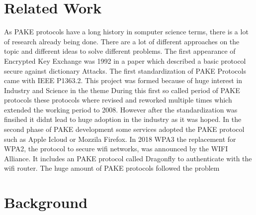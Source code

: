 \documentclass[journal]{IEEEtran}
\begin{document}
\section{Related Work}
As PAKE protocols have a long history in somputer science terms, there is a lot of research already being done.
There are a lot of different approaches on the topic and different ideas to solve different problems.
The first appearance of Encrypted Key Exchange was 1992 in a paper which described a basic protocol secure against dictionary Attacks.
The first standardization of PAKE Protocols came with IEEE P1363.2. This project was formed because of huge interest in Industry and Science in the theme
During this first so called period of PAKE protocols these protocols where revised and reworked multiple times which extended the working period to 2008.
However after the standardization was finsihed it didnt lead to huge adoption in the industry as it was hoped.
In the second phase of PAKE development some services adopted the PAKE protocol such as Apple Icloud or Mozzila Firefox.
In 2018 WPA3 the replacement for WPA2, the protocol to secure wifi networks, was announced by the WIFI Alliance.
It includes an PAKE protocol called Dragonfly to authenticate with the wifi router. 
The huge amount of PAKE protocols followed the problem
\section{Background}
\end{document}
